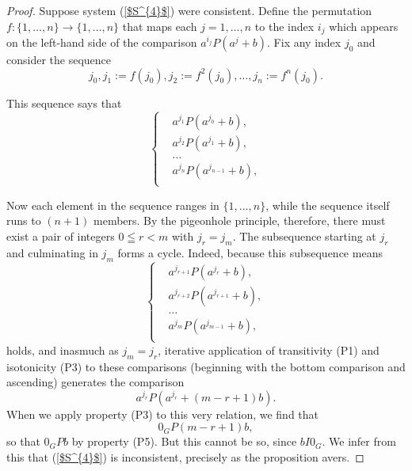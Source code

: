 \documentclass[10pt,a4paper]{amsart}
\begin{document}
\begin{proof}
Suppose system (\ref{$S^{4}$}) were consistent. Define the permutation $f:\{1, \dots, n\} \rightarrow \{1, \dots, n\}$ that maps each $j = 1, \dots, n$ to the index $i_j$ which appears on the left-hand side of the comparison $a^{i_j}P(a^{j}+b)$. Fix any index $j_0$ and consider the sequence \begin{equation*}j_0, j_1 := f(j_0), j_2 := f^2(j_0), \dots, j_n:= f^{n}(j_0).\end{equation*}

This sequence says that \begin{equation*}
  \left\{
    \begin{aligned}
      & a^{j_{1}}P(a^{j_0} + b), \\
      & a^{j_{2}}P(a^{j_{1}}+b), \\
      & \dots \\
      & a^{j_n}P(a^{j_{n-1}} + b), \\
    \end{aligned}
  \right.
\end{equation*} 

Now each element in the sequence ranges in $\{1, \dots, n\}$, while the sequence itself runs to $(n+1)$ members. By the pigeonhole principle, therefore, there must exist a pair of integers $0 \leqq r < m$ with $j_r = j_m$. The subsequence starting at $j_r$ and culminating in $j_m$ forms a cycle. Indeed, because this subsequence means \begin{equation*}
  \left\{
    \begin{aligned}
      & a^{j_{r+1}}P(a^{j_r} + b), \\
      & a^{j_{r+2}}P(a^{j_{r+1}}+b), \\
      & \dots \\
      & a^{j_m}P(a^{j_{m-1}} + b), \\
    \end{aligned}
  \right.
\end{equation*}
holds, and inasmuch as $j_m = j_r$, iterative application of transitivity (P1) and isotonicity (P3) to these comparisons (beginning with the bottom comparison and ascending) generates the comparison \begin{equation*}a^{j_r}P(a^{j_r}+(m-r+1)b).\end{equation*} When we apply property (P3) to this very relation, we find that \begin{equation*}0_GP(m-r+1)b,\end{equation*}
so that $0_GPb$ by property (P5). But this cannot be so, since $bI0_{G}$. We infer from this that (\ref{$S^{4}$}) is inconsistent, precisely as the proposition avers. 


\end{proof}
\end{document}
